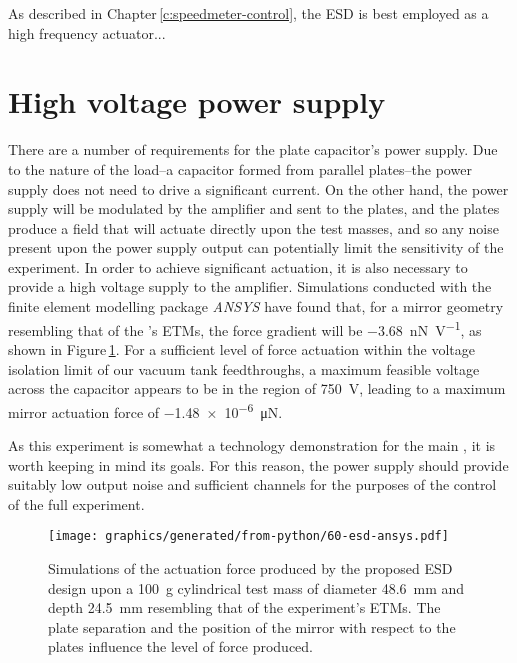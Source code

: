 As described in Chapter\,\ref{c:speedmeter-control}, the \gls{ESD} is best employed as a high frequency actuator...

\section{High voltage power supply}

\newcommand{\ESDFORCEGRAD}{\SI{-3.68}{\nano\newton\per\volt}}

\newcommand{\ESDMAXVOLTAGE}{\SI{750}{\volt}}

\newcommand{\ESDMAXFORCE}{\SI{-1.48e-6}{\micro\newton}}

There are a number of requirements for the plate capacitor's power supply. Due to the nature of the load--a capacitor formed from parallel plates--the power supply does not need to drive a significant current. On the other hand, the power supply will be modulated by the amplifier and sent to the plates, and the plates produce a field that will actuate directly upon the test masses, and so any noise present upon the power supply output can potentially limit the sensitivity of the experiment. In order to achieve significant actuation, it is also necessary to provide a high voltage supply to the amplifier. Simulations conducted with the finite element modelling package \emph{ANSYS} have found that, for a mirror geometry resembling that of the \SSMEXPT{}'s ETMs, the force gradient will be \ESDFORCEGRAD{}, as shown in Figure\,\ref{fig:esd-ansys}. For a sufficient level of force actuation within the voltage isolation limit of our vacuum tank feedthroughs, a maximum feasible voltage across the capacitor appears to be in the region of \ESDMAXVOLTAGE{}, leading to a maximum mirror actuation force of \ESDMAXFORCE{}.

As this experiment is somewhat a technology demonstration for the main \SSMEXPT{}, it is worth keeping in mind its goals. For this reason, the power supply should provide suitably low output noise and sufficient channels for the purposes of the control of the full experiment. 

\begin{figure}
  \centering
  \texttt{[image: graphics/generated/from-python/60-esd-ansys.pdf]}
  \caption{Simulations of the actuation force produced by the proposed \gls{ESD} design upon a \SI{100}{\gram} cylindrical test mass of diameter \SI{48.6}{\milli\meter} and depth \SI{24.5}{\milli\meter} resembling that of the \SSM experiment's ETMs. The plate separation and the position of the mirror with respect to the plates influence the level of force produced. }
  \label{fig:esd-ansys}
\end{figure}

